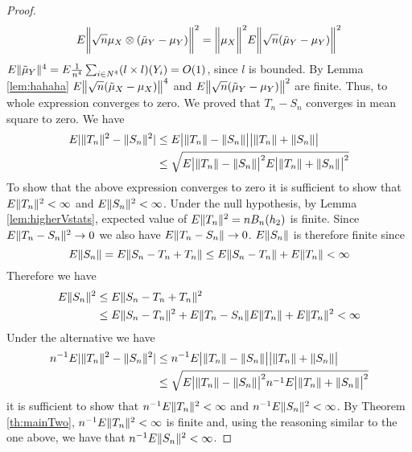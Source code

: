 \begin{proof}
\begin{align*}
   E \bigg \|  \sqrt n \mu_X \otimes ( \tilde \mu_Y   -\mu_Y) \bigg \|^2  &=    \bigg \|  \mu_X \bigg \|^2  E \bigg \|\sqrt n ( \tilde \mu_Y   -\mu_Y) \bigg \|^2  \\
\end{align*}
$ E   \| \tilde \mu_Y \|^4 = E \frac {1} {n^4} \sum_{i \in N^4} (l \times l)(Y_i) = O(1)$, since $ l$ is bounded. By Lemma \ref{lem:hahaha} $E \big \| \sqrt n ( \tilde \mu_X   -\mu_X) \big \|^4$ and $ E \big \|\sqrt n ( \tilde \mu_Y   -\mu_Y) \big \|^2$ are finite. Thus, to whole expression converges to zero. We proved  that $T_n-S_n$ converges in  mean square to zero.
We have 
\begin{align*}
  E | \|T_n\|^2 - \|S_n\|^2 |  & \leq E  \big | \|T_n\| - \|S_n\| \big | \big |  \|T_n\| +  \|S_n\| \big | \\
  &\leq \sqrt{ E \big | \|T_n\| - \|S_n\| \big |^2  E \big| \|T_n\| +  \|S_n\| \big|^2 }\\ 
\end{align*}
To show that the above expression converges to zero it is sufficient to show that  $E \|T_n\|^2< \infty$ and  $E  \|S_n\|^2< \infty$.
Under the null hypothesis, by Lemma \ref{lem:higherVstats}, expected value of   $E \|T_n\|^2 =n B_n(h_2) $ is finite. 
Since $E \| T_n -S_n\|^2 \to 0$ we also have  $E \| T_n -S_n\| \to 0$. $ E \|S_n\|$ is therefore finite since
\[
 E \|S_n\| = E \|S_n - T_n +T_n\| \leq E \|S_n - T_n\| + E \|T_n\|< \infty 
\]
Therefore we have 
\begin{align*}
 E \|S_n\|^2 &\leq E \|S_n-T_n+T_n\|^2 \\
 & \leq E \|S_n-T_n\|^2+ E \| T_n -S_n\| E \|T_n\| + E\|T_n\|^2 < \infty
\end{align*}
Under the alternative we have 
\begin{align*}
  n^{-1}  E | \|T_n\|^2 - \|S_n\|^2 |  &\leq n^{-1}  E \big | \|T_n\| - \|S_n\| \big | \big |   \|T_n\| +  \|S_n\| \big | \\
  &\leq \sqrt{ E \big | \|T_n\| - \|S_n\| \big |^2   n^{-1}E \big| \|T_n\| +  \|S_n\| \big|^2 }\\ 
\end{align*}
it is sufficient to show that  $n^{-1}  E\|T_n\|^2< \infty$ and  $n^{-1}  E \|S_n\|^2< \infty$. By Theorem \ref{th:mainTwo}, $n^{-1}  E \|T_n\|^2< \infty$ is finite and, using the reasoning similar to the one above, we have that    $n^{-1}  E \|S_n\|^2< \infty$.
\end{proof}

